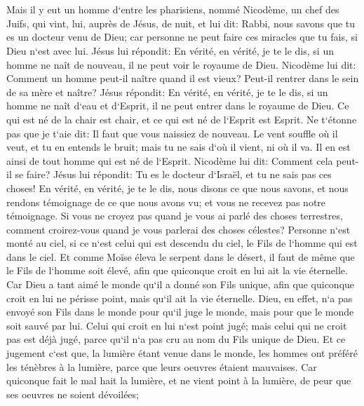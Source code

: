 \chapter{}

\verse Mais il y eut un homme d`entre les pharisiens, nommé Nicodème, un chef des Juifs, 
\verse qui vint, lui, auprès de Jésus, de nuit, et lui dit: Rabbi, nous savons que tu es un docteur venu de Dieu; car personne ne peut faire ces miracles que tu fais, si Dieu n`est avec lui. 
\verse Jésus lui répondit: En vérité, en vérité, je te le dis, si un homme ne naît de nouveau, il ne peut voir le royaume de Dieu. 
\verse Nicodème lui dit: Comment un homme peut-il naître quand il est vieux? Peut-il rentrer dans le sein de sa mère et naître? 
\verse Jésus répondit: En vérité, en vérité, je te le dis, si un homme ne naît d`eau et d`Esprit, il ne peut entrer dans le royaume de Dieu. 
\verse Ce qui est né de la chair est chair, et ce qui est né de l`Esprit est Esprit. 
\verse Ne t`étonne pas que je t`aie dit: Il faut que vous naissiez de nouveau. 
\verse Le vent souffle où il veut, et tu en entends le bruit; mais tu ne sais d`où il vient, ni où il va. Il en est ainsi de tout homme qui est né de l`Esprit. 
\verse Nicodème lui dit: Comment cela peut-il se faire? 
\verse Jésus lui répondit: Tu es le docteur d`Israël, et tu ne sais pas ces choses! 
\verse En vérité, en vérité, je te le dis, nous disons ce que nous savons, et nous rendons témoignage de ce que nous avons vu; et vous ne recevez pas notre témoignage. 
\verse Si vous ne croyez pas quand je vous ai parlé des choses terrestres, comment croirez-vous quand je vous parlerai des choses célestes? 
\verse Personne n`est monté au ciel, si ce n`est celui qui est descendu du ciel, le Fils de l`homme qui est dans le ciel. 
\verse Et comme Moïse éleva le serpent dans le désert, il faut de même que le Fils de l`homme soit élevé, 
\verse afin que quiconque croit en lui ait la vie éternelle. 
\verse Car Dieu a tant aimé le monde qu`il a donné son Fils unique, afin que quiconque croit en lui ne périsse point, mais qu`il ait la vie éternelle. 
\verse Dieu, en effet, n`a pas envoyé son Fils dans le monde pour qu`il juge le monde, mais pour que le monde soit sauvé par lui. 
\verse Celui qui croit en lui n`est point jugé; mais celui qui ne croit pas est déjà jugé, parce qu`il n`a pas cru au nom du Fils unique de Dieu. 
\verse Et ce jugement c`est que, la lumière étant venue dans le monde, les hommes ont préféré les ténèbres à la lumière, parce que leurs oeuvres étaient mauvaises. 
\verse Car quiconque fait le mal hait la lumière, et ne vient point à la lumière, de peur que ses oeuvres ne soient dévoilées; 

